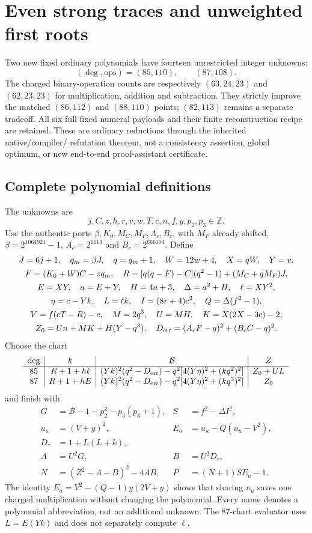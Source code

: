 \section{Even strong traces and unweighted first roots}
\label{sec:even-strong-roots}
Two new fixed ordinary polynomials have fourteen unrestricted integer unknowns:
\[
 (\deg,\mathrm{ops})=(85,110),\qquad (87,108).
\]
The charged binary-operation counts are respectively $(63,24,23)$ and
$(62,23,23)$ for multiplication, addition and subtraction. They strictly improve
the matched $(86,112)$ and $(88,110)$ points; $(82,113)$ remains a separate tradeoff.
All six full fixed numeral payloads and their finite reconstruction recipe are
retained. These are ordinary reductions through the inherited native/compiler/
refutation theorem, not a consistency assertion, global optimum, or new
end-to-end proof-assistant certificate.

\subsection{Complete polynomial definitions}
The unknowns are
\[
 j,C,z,h,r,v,w,T,c,n,f,y,p_2,p_3\in\mathbb Z.
\]
Use the authentic ports $\beta,K_0,M_C,M_F,A_c,B_c$, with $M_F$ already shifted,
$\beta=2^{1064921}-1$, $A_c=2^{1113}$ and $B_c=2^{666104}$. Define
\begin{gather*}
 J=6j+1,\quad q_m=\beta J,\quad q=q_m+1,\quad W=12w+4,\quad X=qW,\quad Y=v,\\
 F=(K_0+W)C-zq_m,\quad
 R=[q(q-F)-C](q^2-1)+(M_C+qM_F)J,\\
 E=XY,\quad a=E+Y,\quad H=4a+3,\quad\Delta=a^2+H,\quad\ell=XY^2,\\
 \eta=c-Yk,\quad L=\ell k,\quad I=(8r+4)c^2,\quad Q=\Delta(f^2-1),\\
 V=f(cT-R)-c,\quad M=2q^3,\quad U=MH,\quad K=X(2X-3c)-2,\\
 Z_0=Un+MK+H(Y-q^3),\quad
 D_{\rm err}=(A_cF-q)^2+(B_cC-q)^2.
\end{gather*}
Choose the chart
\[
\begin{array}{c|c|c|c}
\deg&k&\mathcal B&Z\\\hline
85&R+1+h\ell&(Yk)^2(q^2-D_{\rm err})-q^2[4(Y\eta)^2+(kq^2)^2]&Z_0+UL\\
87&R+1+hE&(Yk)^2(q^2-D_{\rm err})-q^2[4(Y\eta)^2+(kq^3)^2]&Z_0
\end{array}
\]
and finish with
\begin{align*}
 G&=\mathcal B-1-p_2^2-p_3(p_3+1),&S&=f^2-\Delta I^2,\\
 u_u&=(V+y)^2,&E_a&=u_u-Q(u_u-V^2),\\
 D_\tau&=1+L(L+k),\\
 A&=U^2G,&B&=U^2D_\tau,\\
 N&=(Z^2-A-B)^2-4AB,&P&=(N+1)SE_a-1.
\end{align*}
The identity $E_a=V^2-(Q-1)y(2V+y)$ shows that sharing $u_u$ saves one
charged multiplication without changing the polynomial. Every name denotes a
polynomial abbreviation, not an additional unknown. The
87-chart evaluator uses $L=E(Yk)$ and does not separately compute $\ell$.


